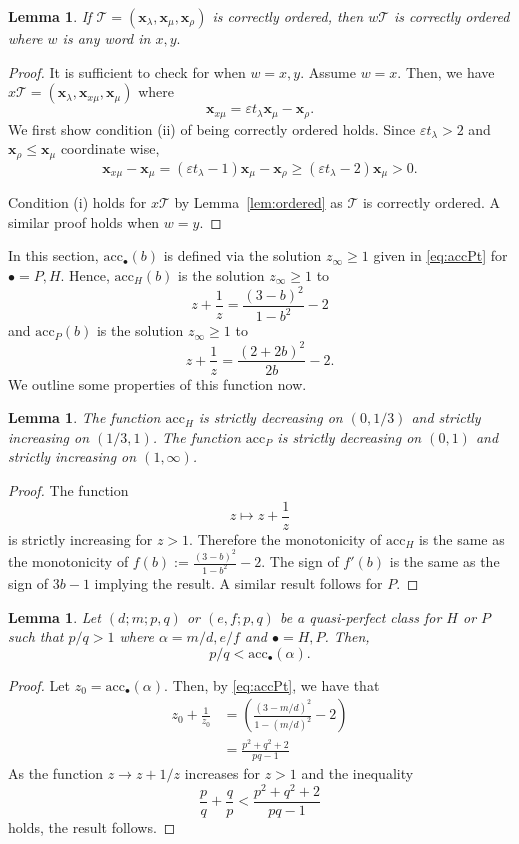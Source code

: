\documentclass[11pt, reqno]{amsart}
\newtheorem{lemma}[thm]{Lemma}
\theoremstyle{remark}
\numberwithin{equation}{subsection}
\numberwithin{figure}{section}
\theoremstyle{customremark}
\newcommand{\Tt}{\mathcal{T}}
\newcommand{\al}{{\alpha}}
\newcommand{\la}{{\lambda}}
\newcommand{\eps}{\varepsilon}
\newcommand{\acc}{\mathrm{acc}}
\begin{document}
\begin{lemma}\label{lem:correctlyOrdered}
    If $\Tt=(\bm{x}_\la,\bm{x}_\mu,\bm{x}_\rho)$ is correctly ordered, then $w\Tt$ is correctly ordered where $w$ is any word in $x,y.$
\end{lemma}
\begin{proof}
    It is sufficient to check for when $w=x,y.$ Assume $w=x.$ Then, we have $x\Tt=(\bm{x}_\la,\bm{x}_{x\mu},\bm{x}_\mu)$ where
    \[ \bm{x}_{x\mu}=\eps t_\la \bm{x}_\mu-\bm{x}_\rho.\] 
    We first show condition (ii) of being correctly ordered holds.
    Since \(\eps t_\lambda>2\) and \(\bm{x}_\rho\leq \bm{x}_\mu\) coordinate wise,
\[
\bm{x}_{x\mu}-\bm{x}_\mu
=
(\eps t_\lambda-1)\bm{x}_\mu-\bm{x}_\rho
\geq
(\eps t_\lambda-2)\bm{x}_\mu>0.
\]
    
    Condition (i) holds for $x\Tt$ by Lemma~\ref{lem:ordered} as $\Tt$ is correctly ordered. A similar proof holds when $w=y.$ 
\end{proof}

 
In this section, $\acc_\bullet(b)$ is defined via the solution $z_\infty \geq 1$ given in \eqref{eq:accPt} for $\bullet=P,H$. Hence, $\acc_H(b)$ is the solution $z_\infty \geq 1$ to 
\[
        z+\frac{1}{z}
        =
        \frac{(3-b)^2}{1-b^2}-2
\]
and
$\acc_P(b)$ is the solution $z_\infty \geq 1$ to 
\[  z+\frac{1}{z}=
        \frac{(2+2b)^2}{2b}-2.\]
We outline some properties of this function now. 
\begin{lemma}\label{lem:accMonotone}
The function $\acc_H$ is strictly decreasing on $(0,1/3)$ and strictly increasing on $(1/3,1)$. The function $\acc_P$ is strictly decreasing on $(0,1)$ and strictly increasing on $(1,\infty)$. 
\end{lemma}

\begin{proof}
The function
\[
        z\mapsto z+\frac{1}{z}
\]
is strictly increasing for $z>1$. Therefore the monotonicity of
$\acc_H$ is the same as the monotonicity of $ f(b):=\frac{(3-b)^2}{1-b^2}-2.$ The sign of $f'(b)$ is the same as the sign of $3b-1$ implying the result. A similar result follows for $P.$
\end{proof}

\begin{lemma} \label{lem:pqAlOrder}
Let $(d;m;p,q)$ or $(e,f;p,q)$ be a quasi-perfect class for $H$ or $P$ such that $p/q>1$ where $\al=m/d,e/f$ and $\bullet=H,P$. 
Then, \[p/q<\acc_\bullet(\al).\]
\end{lemma}
\begin{proof}
    Let $z_0=\acc_\bullet(\al).$ Then, by \eqref{eq:accPt}, we have that
    \begin{align*}
         z_0+\frac{1}{z_0}&=\left(\frac{(3-m/d)^2}{1-(m/d)^2}-2\right) \\
         &=\frac{p^2+q^2+2}{pq-1}
    \end{align*}
    As the function $z \to z+1/z$ increases for $z>1$ and the inequality
    \[ \frac{p}{q}+\frac{q}{p}<\frac{p^2+q^2+2}{pq-1}\] holds,
    the result follows. 
\end{proof}
\end{document}

